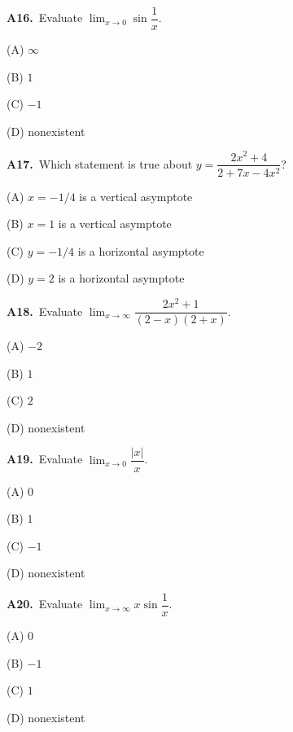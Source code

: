 \documentclass[11pt]{article}
\begin{document}
\bigskip\noindent\textbf{A16.}\ Evaluate $\displaystyle\lim_{x\to0}\sin\dfrac1x$.
\begin{list}{}{\setlength{\leftmargin}{3em}\setlength{\labelwidth}{2.5em}\setlength{\itemsep}{0pt}\setlength{\topsep}{2pt}}
\item[(A)] $\infty$
\item[(B)] $1$
\item[(C)] $-1$
\item[(D)] nonexistent
\end{list}

\bigskip\noindent\textbf{A17.}\ Which statement is true about $y=\dfrac{2x^2+4}{2+7x-4x^2}$?
\begin{list}{}{\setlength{\leftmargin}{3em}\setlength{\labelwidth}{2.5em}\setlength{\itemsep}{0pt}\setlength{\topsep}{2pt}}
\item[(A)] $x=-1/4$ is a vertical asymptote
\item[(B)] $x=1$ is a vertical asymptote
\item[(C)] $y=-1/4$ is a horizontal asymptote
\item[(D)] $y=2$ is a horizontal asymptote
\end{list}

\bigskip\noindent\textbf{A18.}\ Evaluate $\displaystyle\lim_{x\to\infty}\dfrac{2x^2+1}{(2-x)(2+x)}$.
\begin{list}{}{\setlength{\leftmargin}{3em}\setlength{\labelwidth}{2.5em}\setlength{\itemsep}{0pt}\setlength{\topsep}{2pt}}
\item[(A)] $-2$
\item[(B)] $1$
\item[(C)] $2$
\item[(D)] nonexistent
\end{list}

\bigskip\noindent\textbf{A19.}\ Evaluate $\displaystyle\lim_{x\to0}\dfrac{|x|}{x}$.
\begin{list}{}{\setlength{\leftmargin}{3em}\setlength{\labelwidth}{2.5em}\setlength{\itemsep}{0pt}\setlength{\topsep}{2pt}}
\item[(A)] $0$
\item[(B)] $1$
\item[(C)] $-1$
\item[(D)] nonexistent
\end{list}

\bigskip\noindent\textbf{A20.}\ Evaluate $\displaystyle\lim_{x\to\infty}x\sin\dfrac1x$.
\begin{list}{}{\setlength{\leftmargin}{3em}\setlength{\labelwidth}{2.5em}\setlength{\itemsep}{0pt}\setlength{\topsep}{2pt}}
\item[(A)] $0$
\item[(B)] $-1$
\item[(C)] $1$
\item[(D)] nonexistent
\end{list}
\end{document}
